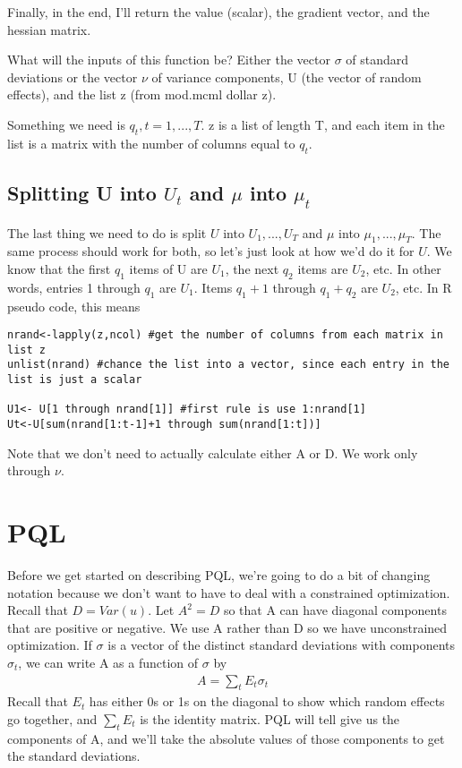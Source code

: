\documentclass{article}
\begin{document}
Finally, in the end, I'll return the value (scalar), the gradient vector, and the hessian matrix.

What will the inputs of this function be? Either the vector $\sigma$ of standard deviations or the vector $\nu$ of variance components, U (the vector of random effects), and the list z (from mod.mcml dollar z).  

Something we need is $q_t,t=1,...,T$. z is a list of length T, and each item in the list is a matrix with the number of columns equal to $q_t$.

\subsection{Splitting U into $U_t$ and $\mu$ into $\mu_t$}
The last thing we need to do is split $U$ into $U_1,...,U_T$ and $\mu$ into $\mu_1,...,\mu_T$. The same process should work for both, so let's just look at how we'd do it for $U$.  We know that the first $q_1$ items of U are $U_1$, the next $q_2$ items are $U_2$, etc.  In other words, entries 1 through $q_1$ are $U_1$. Items $q_1+1$ through $q_1+q_2$ are $U_2$, etc. In R pseudo code, this means 
\begin{verbatim}
nrand<-lapply(z,ncol) #get the number of columns from each matrix in list z
unlist(nrand) #chance the list into a vector, since each entry in the list is just a scalar

U1<- U[1 through nrand[1]] #first rule is use 1:nrand[1]
Ut<-U[sum(nrand[1:t-1]+1 through sum(nrand[1:t])]
\end{verbatim} 

Note that we don't need to actually calculate either A or D. We work only through $\nu$.


\section{PQL}
 Before we get started on describing PQL, we're going to do a bit of changing notation because we don't want to have to deal with a constrained optimization.  Recall that $D=Var(u)$. Let $A^2=D$ so that A can have diagonal components that are positive or negative. We use A rather than D so we have unconstrained optimization.  If $\sigma$ is a vector of the distinct standard deviations with components $\sigma_t$, we can write A as a function of $\sigma$ by
\begin{align*}
A= \sum_t E_t \sigma_t
\end{align*}
Recall that $E_t$ has either 0s or 1s on the diagonal to show which random effects go together, and $\sum_t E_t$ is the identity matrix. PQL will tell give us the components of A, and we'll take the absolute values of those components to get the standard deviations.
\end{document}
